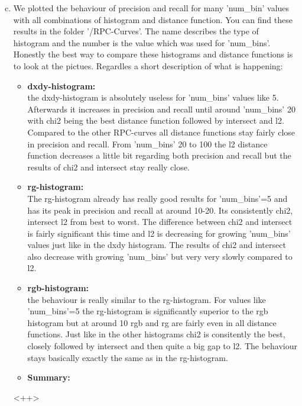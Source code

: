 \documentclass[12pt]{article}
\begin{document}
\begin{enumerate}[a)]
    \setcounter{enumi}{2}
    \item 
        We plotted the behaviour of precision and recall for many 'num\_bin' values with all combinations of histogram and distance function. You can find these results in the folder '/RPC-Curves'. The name describes the type of histogram and the number is the value which was used for 'num\_bins'. Honestly the best way to compare these histograms and distance functions is to look at the pictues. Regardles a short description of what is happening:
        \begin{itemize}
            \item 
                \textbf{dxdy-histogram:}\\
                the dxdy-histogram is absolutely useless for 'num\_bins' values like 5. Afterwards it increases in precision and recall until around 'num\_bins' 20 with chi2 being the best distance function followed by intersect and l2. Compared to the other RPC-curves all distance functions stay fairly close in precision and recall. From 'num\_bins' 20 to 100 the l2 distance function decreases a little bit regarding both precision and recall but the results of chi2 and intersect stay really close.
            \item 
                \textbf{rg-histogram:}\\
                The rg-histogram already has really good results for 'num\_bins'=5 and has its peak in precision and recall at around 10-20. Its consistently chi2, intersect l2 from best to worst. The difference between chi2 and intersect is fairly significant this time and l2 is decreasing for growing 'num\_bins' values just like in the dxdy histogram. The results of chi2 and intersect also decrease with growing 'num\_bins' but very very slowly compared to l2.
            \item 
                \textbf{rgb-histogram:}\\
                the behaviour is really similar to the rg-histogram. For values like 'num\_bins'=5 the rg-histogram is significantly superior to the rgb histogram but at around 10 rgb and rg are fairly even in all distance functions. Just like in the other histograms chi2 is consitently the best, closely followed by intersect and then quite a big gap to l2. The behaviour stays basically exactly the same as in the rg-histogram.

            \item
                \textbf{Summary:}\\


                

        \end{itemize}<++>


\end{enumerate}
\end{document}
